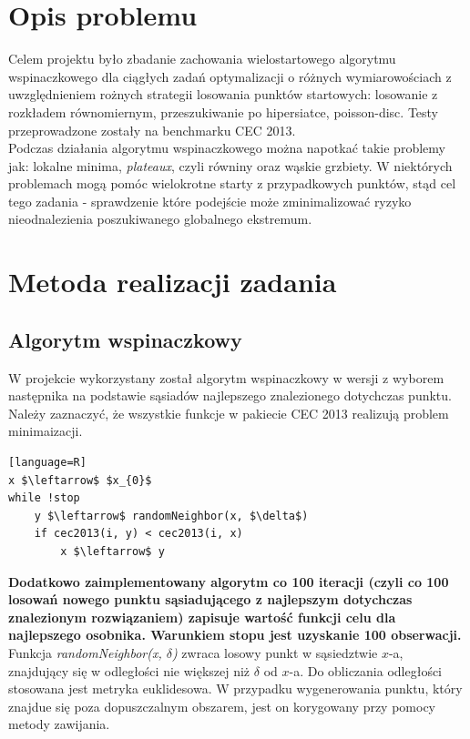 \documentclass{article}
\begin{document}
\section{Opis problemu}

Celem projektu było zbadanie zachowania wielostartowego algorytmu wspinaczkowego dla ciągłych zadań optymalizacji o różnych wymiarowościach z uwzględnieniem rożnych strategii losowania punktów startowych: losowanie z rozkładem równomiernym, przeszukiwanie po hipersiatce, poisson-disc. Testy przeprowadzone zostały na benchmarku CEC 2013.\\

Podczas działania algorytmu wspinaczkowego można napotkać takie problemy jak: lokalne minima, \textit{plateaux}, czyli równiny oraz wąskie grzbiety. W niektórych problemach mogą pomóc wielokrotne starty z przypadkowych punktów, stąd cel tego zadania - sprawdzenie które podejście może zminimalizować ryzyko nieodnalezienia poszukiwanego globalnego ekstremum.

\section{Metoda realizacji zadania}

\subsection{Algorytm wspinaczkowy}

W projekcie wykorzystany został algorytm wspinaczkowy w wersji z wyborem następnika na podstawie sąsiadów najlepszego znalezionego dotychczas punktu. \\
Należy zaznaczyć, że wszystkie funkcje w pakiecie CEC 2013 realizują problem minimaizacji.

\begin{lstlisting}[mathescape][language=R]
x $\leftarrow$ $x_{0}$
while !stop
	y $\leftarrow$ randomNeighbor(x, $\delta$)
	if cec2013(i, y) < cec2013(i, x)
		x $\leftarrow$ y
\end{lstlisting}


\textbf{Dodatkowo zaimplementowany algorytm co 100 iteracji (czyli co 100 losowań nowego punktu sąsiadującego z najlepszym dotychczas znalezionym rozwiązaniem) zapisuje wartość funkcji celu dla najlepszego osobnika. Warunkiem stopu jest uzyskanie 100 obserwacji.}\\

Funkcja \textit{randomNeighbor(x, $\delta$)} zwraca losowy punkt w sąsiedztwie $x$-a, znajdujący się w odległości nie większej niż $\delta$ od $x$-a. Do obliczania odległości stosowana jest metryka euklidesowa. W przypadku wygenerowania punktu, który znajdue się poza dopuszczalnym obszarem, jest on korygowany przy pomocy metody zawijania.\\
\end{document}
